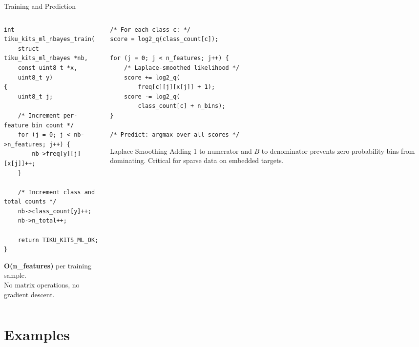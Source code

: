 \documentclass[aspectratio=169, 10pt]{beamer}
\begin{document}
\begin{frame}[fragile]{Training and Prediction}
\begin{columns}[T]
\begin{column}{0.48\textwidth}
\begin{lstlisting}[style=cstyle,
  title={Training: frequency counting}]
int tiku_kits_ml_nbayes_train(
    struct tiku_kits_ml_nbayes *nb,
    const uint8_t *x,
    uint8_t y)
{
    uint8_t j;

    /* Increment per-feature bin count */
    for (j = 0; j < nb->n_features; j++) {
        nb->freq[y][j][x[j]]++;
    }

    /* Increment class and total counts */
    nb->class_count[y]++;
    nb->n_total++;

    return TIKU_KITS_ML_OK;
}
\end{lstlisting}

\vspace{0.3em}
\textbf{O(n\_features)} per training sample.\\
No matrix operations, no gradient descent.
\end{column}

\begin{column}{0.48\textwidth}
\begin{lstlisting}[style=cstyle,
  title={Prediction: log-likelihood scoring}]
/* For each class c: */
score = log2_q(class_count[c]);

for (j = 0; j < n_features; j++) {
    /* Laplace-smoothed likelihood */
    score += log2_q(
        freq[c][j][x[j]] + 1);
    score -= log2_q(
        class_count[c] + n_bins);
}

/* Predict: argmax over all scores */
\end{lstlisting}

\vspace{0.3em}
\begin{block}{Laplace Smoothing}
Adding 1 to numerator and $B$ to denominator
prevents zero-probability bins from dominating.
Critical for sparse data on embedded targets.
\end{block}
\end{column}
\end{columns}
\end{frame}

\section{Examples}
\end{document}
